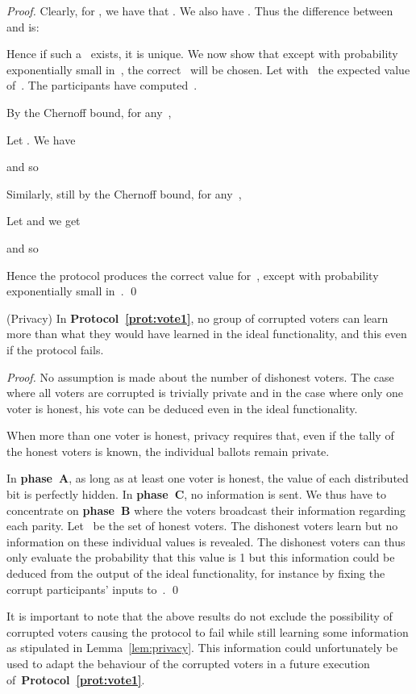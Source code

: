 \documentclass[runningheads]{llncs}
\begin{document}
\begin{proof}
Clearly,  for , we have that . We also have
.
Thus the difference between  and  is:


Hence if such a~ exists, it is unique. We now show that except
with probability exponentially small in~, the correct~ will be
chosen. Let  with~ the
expected value of~. The participants have computed \,.

By the Chernoff bound, for any~\mbox{},

Let . We have

and so


Similarly, still by the Chernoff bound, for any~\mbox{},

Let  and we get

and so

Hence the protocol produces the correct value for~, except
with probability exponentially small in~. \qed
\end{proof}


\begin{lemma}(Privacy)
\label{lem:privacy} In \textbf{Protocol~\ref{prot:vote1}}, no group
of corrupted voters can learn more than what they would have learned
in the ideal functionality, and this even if the protocol fails.
\end{lemma}

\begin{proof}
No assumption is made about the number of dishonest voters. The case
where all voters are corrupted is
trivially private
and in the case where only one voter is honest, his vote can be
deduced even in the ideal functionality.

When more than one voter is honest, privacy requires that, even if
the tally of the honest voters is known, the individual ballots
remain private.

In  \textbf{phase~A}, as long as at least one voter is honest, the
value of each distributed bit is perfectly hidden. In
\textbf{phase~C}, no  information is sent. We thus have to concentrate on \textbf{phase~B} where the voters
broadcast their information regarding each parity. Let~ be the
set of honest voters. The dishonest voters learn  but no information on these individual values is
revealed. The dishonest voters can thus only evaluate the
probability that this value is 1 but this information could be
deduced from the output of the ideal functionality, for instance by
fixing the corrupt participants' inputs to~. \qed
\end{proof}

It is important to note that the above results do not exclude the
possibility of corrupted voters causing the protocol to fail while
still learning some information as stipulated in
Lemma~\ref{lem:privacy}. This information could unfortunately be
used to adapt the behaviour of the corrupted voters in a future
execution of~\textbf{Protocol~\ref{prot:vote1}}.
\end{document}
